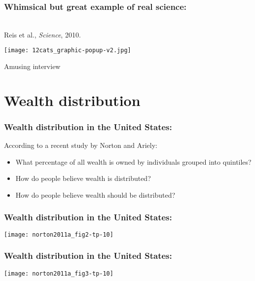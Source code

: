\begin{frame}
  \frametitle{Whimsical but great example of real science:}

  \\
  Reis et al., \textit{Science}, 2010.

  \medskip

  \texttt{[image: 12cats\_graphic-popup-v2.jpg]}

  Amusing interview 

\end{frame}


\section{Wealth distribution}

\begin{frame}
  \frametitle{Wealth distribution in the United States:}

  According to a recent study by Norton and Ariely:\cite{norton2011a}
  \begin{itemize}
  \item<2->
    What percentage of all wealth is owned by 
    individuals grouped into quintiles?
  \item<3->
    How do people believe wealth is distributed?
  \item<4->
    How do people believe wealth should be distributed?
  \end{itemize}
  
\end{frame}

\begin{frame}

  \frametitle{Wealth distribution in the United States:}

  \texttt{[image: norton2011a\_fig2-tp-10]}
  
\end{frame}

\begin{frame}

  \frametitle{Wealth distribution in the United States:}

  \texttt{[image: norton2011a\_fig3-tp-10]}
  
\end{frame}

